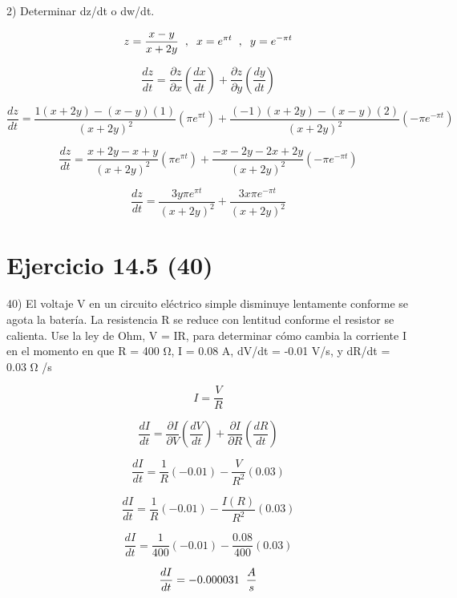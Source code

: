 2) Determinar dz/dt o dw/dt. \vspace{2mm}

\[z = \frac{x-y}{x+2y}\hspace{2mm} , \hspace{2mm} x = e^{\pi t}\hspace{2mm} , \hspace{2mm} y = e^{-\pi t}\]

 \[\frac{d z}{dt} = \frac{\partial z}{\partial x} (\frac{d x}{d t}) + \frac{\partial z}{\partial y}  (\frac{d y}{d t})\]

\[\frac{d z}{dt} = \frac{1(x+2y)-(x-y)(1)}{(x+2y)^2} (\pi e^{\pi t}) + \frac{(-1)(x+2y)-(x-y)(2)}{(x+2y)^2}  (-\pi e^{-\pi t})\]

\[\frac{d z}{dt} = \frac{x+2y-x+y}{(x+2y)^2} (\pi e^{\pi t}) + \frac{-x-2y-2x+2y}{(x+2y)^2}  (-\pi e^{-\pi t})\]

\[\frac{d z}{dt} = \frac{3y\pi e^{\pi t}} {(x+2y)^2} + \frac{3x\pi e^{-\pi t}} {(x+2y)^2}  \]




\section{Ejercicio 14.5 (40)}

40) El voltaje V en un circuito eléctrico simple disminuye
lentamente conforme se agota la batería. La resistencia R
se reduce con lentitud conforme el resistor se calienta.
Use la ley de Ohm, V = IR, para determinar cómo cambia
la corriente I en el momento en que R = 400 $\si{\ohm}$,
I = 0.08 A, dV/dt = -0.01 V/s, y dR/dt = 0.03 $\si{\ohm}$ /s


\[I = \frac{V}{R}\]

\[\frac{d I}{dt} = \frac{\partial I}{\partial V} (\frac{d V}{d t}) + \frac{\partial I}{\partial R}  (\frac{d R}{d t})\]

\[\frac{d I}{dt} = \frac{1}{R} (-0.01) - \frac{V}{R^2}  (0.03)\]

\[\frac{d I}{dt} = \frac{1}{R} (-0.01) - \frac{I(R)}{R^2}  (0.03)\]

\[\frac{d I}{dt} = \frac{1}{400} (-0.01) - \frac{0.08}{400}  (0.03)\]

\[\frac{d I}{dt} = -0.000031 \hspace{2mm}\frac{A}{s}\]



